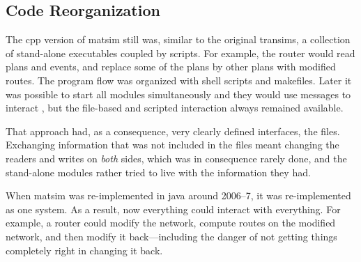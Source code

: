 

%


\subsection{Code Reorganization}
\label{sec:matsim-core-reorg}
The \gls{cpp} version of \gls{matsim} still was, similar to the original \gls{transims}, a collection of stand-alone executables coupled by scripts.  For example, the router would read plans and events, and replace some of the plans by other plans with modified routes.  The program flow was organized with shell scripts and makefiles.  Later it was possible to start all modules simultaneously and they would use messages to interact \citep[also see][]{GloorNagel2005ped-att04-birkh}, but the file-based and scripted interaction always remained available.

That approach had, as a consequence, very clearly defined interfaces, \ie the files. Exchanging information that was not included in the files meant changing the readers and writes on \emph{both} sides, which was in consequence rarely done, and the stand-alone modules rather tried to live with the information they had.

When \gls{matsim} was re-implemented in \gls{java} around 2006--7, it was re-implemented as one system.  As a result, now everything could interact with everything.  For example, a router could modify the network, compute routes on the modified network, and then modify it back---including the danger of not getting things completely right in changing it back.  


